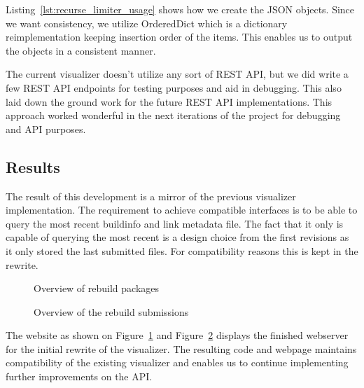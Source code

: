 \documentclass[../Main/thesis.tex]{subfiles}
\begin{document}
Listing~\ref{lst:recurse_limiter_usage} shows how we create the JSON objects.
Since we want consistency, we utilize OrderedDict which is a dictionary
reimplementation keeping insertion order of the items. This enables us to output
the objects in a consistent manner.

The current visualizer doesn't utilize any sort of REST API, but we did write a
few REST API endpoints for testing  purposes and aid in debugging. This also
laid down the ground work for the future REST API implementations. This
approach worked wonderful in the next iterations of the project for debugging
and API purposes.


\subsection*{Results}%
\label{sub:first_iteration_results}

The result of this development is a mirror of the previous visualizer
implementation. The requirement to achieve compatible interfaces is to be able
to query the most recent buildinfo and link metadata file. The fact that it
only is capable of querying the most recent is a design choice from the
first revisions as it only stored the last submitted files. For compatibility
reasons this is kept in the rewrite.

\begin{figure}[H]
\caption{Overview of rebuild packages}%
\label{fig:rebuild-overview} 
\end{figure}

\begin{figure}[H]
\caption{Overview of the rebuild submissions}%
\label{fig:submission-overview} 
\end{figure}

The website as shown on Figure~\ref{fig:rebuild-overview} and
Figure~\ref{fig:submission-overview} displays the finished webserver for the
initial rewrite of the visualizer. The resulting code and webpage maintains
compatibility of the existing visualizer and enables us to continue implementing
further improvements on the API.
\end{document}
